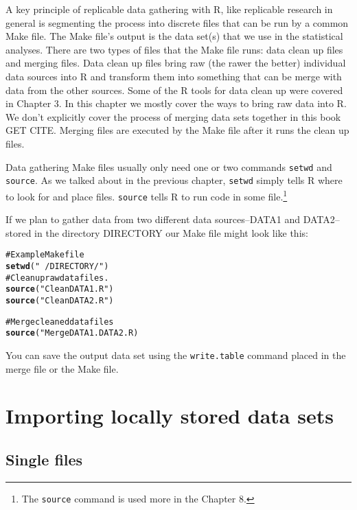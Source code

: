 \documentclass[ChapterTOCs,krantz1]{krantz}\usepackage{graphicx, color}
\makeatletter
\newcommand{\hlfunctioncall}[1]{\textcolor[rgb]{0.501960784313725,0,0.329411764705882}{\textbf{#1}}}%
\newcommand{\hlstring}[1]{\textcolor[rgb]{0.6,0.6,1}{#1}}%
\newcommand{\hlcomment}[1]{\textcolor[rgb]{0.180392156862745,0.6,0.341176470588235}{#1}}%
\newenvironment{kframe}{%
 \def\at@end@of@kframe{}%
 \ifinner\ifhmode%
  \def\at@end@of@kframe{\end{minipage}}%
  \begin{minipage}{\columnwidth}%
 \fi\fi%
 \def\FrameCommand##1{\hskip\@totalleftmargin \hskip-\fboxsep
 \colorbox{shadecolor}{##1}\hskip-\fboxsep
     \hskip-\linewidth \hskip-\@totalleftmargin \hskip\columnwidth}%
 \MakeFramed {\advance\hsize-\width
   \@totalleftmargin\z@ \linewidth\hsize
   \@setminipage}}%
 {\par\unskip\endMakeFramed%
 \at@end@of@kframe}
\newenvironment{knitrout}{}{} %
\makeatother
\begin{document}
A key principle of replicable data gathering with R, like replicable research in general is segmenting the process into discrete files that can be run by a common Make file. The Make file's output is the data set(s) that we use in the statistical analyses. There are two types of files that the Make file runs: data clean up files and merging files. Data clean up files bring raw (the rawer the better) individual data sources into R and transform them into something that can be merge with data from the other sources. Some of the R tools for data clean up were covered in Chapter 3. In this chapter we mostly cover the ways to bring raw data into R. We don't explicitly cover the process of merging data sets together in this book GET CITE. Merging files are executed by the Make file after it runs the clean up files.

Data gathering Make files usually only need one or two commands {\tt{setwd}} and {\tt{source}}. As we talked about in the previous chapter, {\tt{setwd}} simply tells R where to look for and place files. {\tt{source}} tells R to run code in some file.\footnote{The {\tt{source}} command is used more in the Chapter 8.} 

If we plan to gather data from two different data sources--DATA1 and DATA2--stored in the directory DIRECTORY our Make file might look like this:

\begin{knitrout}
\color{fgcolor}\begin{kframe}
\begin{alltt}
\hlcomment{# Example Make file}
\hlfunctioncall{setwd}(\hlstring{"~/DIRECTORY/"})
\hlcomment{# Clean up raw data files.}
\hlfunctioncall{source}(\hlstring{"CleanDATA1.R"})
\hlfunctioncall{source}(\hlstring{"CleanDATA2.R"})
    
\hlcomment{# Merge cleaned data files}
\hlfunctioncall{source}("MergeDATA1.DATA2.R)
\end{alltt}
\end{kframe}
\end{knitrout}


You can save the output data set using the {\tt{write.table}} command placed in the merge file or the Make file.

\section{Importing locally stored data sets}

\subsection{Single files}
\end{document}
